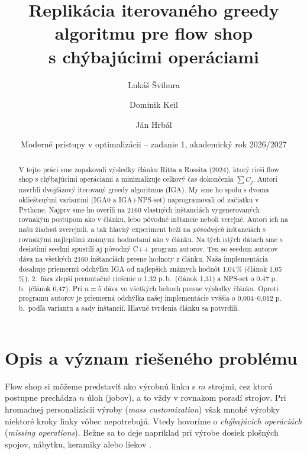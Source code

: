 \documentclass[11pt,a4paper]{article}
\title{Replikácia iterovaného greedy algoritmu pre flow shop\\s chýbajúcimi operáciami}
\author{Lukáš Švihura \and Dominik Keil \and Ján Hrbál}
\date{Moderné prístupy v optimalizácii -- zadanie 1, akademický rok 2026/2027}
\newcommand{\Csum}{\sum C_j}
\begin{document}
\maketitle


\begin{abstract}
V tejto práci sme zopakovali výsledky článku Ritta a Rossita (2024), ktorý rieši flow shop
s chýbajúcimi operáciami a minimalizuje celkový čas dokončenia $\Csum$. Autori navrhli
dvojfázový iterovaný greedy algoritmus (IGA). My sme ho spolu s dvoma oklieštenými variantmi
(IGA0 a IGA+NPS-set) naprogramovali od začiatku v Pythone. Najprv sme ho overili na 2160
vlastných inštanciách vygenerovaných rovnakým postupom ako v článku, lebo pôvodné inštancie
neboli verejné. Autori ich na našu žiadosť zverejnili, a tak hlavný experiment beží na
\emph{pôvodných} inštanciách s rovnakými najlepšími známymi hodnotami ako v článku. Na tých
istých dátach sme s desiatimi seedmi spustili aj pôvodný C++ program autorov. Ten so seedom
autorov dáva na všetkých 2160 inštanciách presne hodnoty z článku. Naša implementácia dosahuje
priemernú odchýlku IGA od najlepších známych hodnôt 1,04\,\% (článok 1,05\,\%), 2.~fáza zlepší
permutačné riešenie o 1,32 p.\,b.\ (článok 1,31) a NPS-set o 0,47 p.\,b.\ (článok 0,47).
Pri $n=5$ dáva vo všetkých behoch presne výsledky článku. Oproti programu autorov je priemerná
odchýlka našej implementácie vyššia o 0,004--0,012 p.\,b.\ podľa variantu a sady inštancií.
Hlavné tvrdenia článku sa potvrdili.
\end{abstract}

\section{Opis a význam riešeného problému}

Flow shop si môžeme predstaviť ako výrobnú linku s $m$ strojmi, cez ktorú postupne prechádza
$n$ úloh (jobov), a to vždy v rovnakom poradí strojov. Pri hromadnej personalizácii výroby
(\emph{mass customization}) však mnohé výrobky niektoré kroky linky vôbec nepotrebujú. Vtedy
hovoríme o \emph{chýbajúcich operáciách} (\emph{missing operations}). Bežne sa to deje
napríklad pri výrobe dosiek plošných spojov, nábytku, keramiky alebo liekov \cite{RittRossit2024}.
\end{document}
